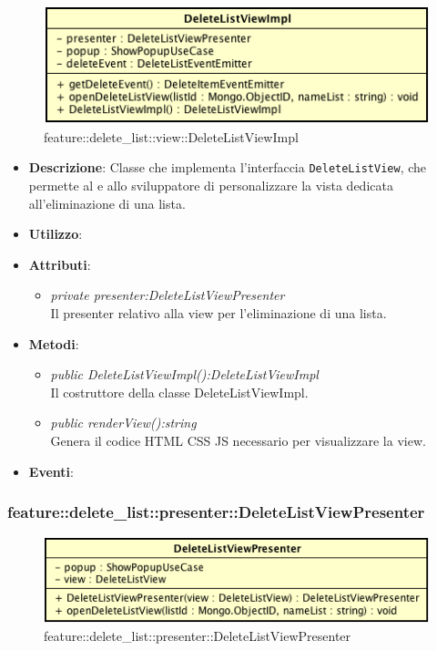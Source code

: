 \label{feature::delete_list::view::DeleteListViewImpl}
\begin{figure}[H]
	\centering
	\includegraphics[scale=0.5]{Sezioni/SottosezioniST/img/app/DeleteListViewImpl.png}
	\caption{feature::delete\_list::view::DeleteListViewImpl}
\end{figure}

\begin{itemize}
\item \textbf{Descrizione}: Classe che implementa l'interfaccia \texttt{DeleteListView}, che permette al  e allo sviluppatore di personalizzare la vista dedicata all'eliminazione di una lista.
\item \textbf{Utilizzo}:
\item \textbf{Attributi}: 
	\begin{itemize}
	\item \textit{private presenter:DeleteListViewPresenter}\\
		Il presenter relativo alla view per l'eliminazione di una lista.
	\end{itemize}
\item \textbf{Metodi}:
	\begin{itemize}
	\item \textit{public DeleteListViewImpl():DeleteListViewImpl}\\
	Il costruttore della classe DeleteListViewImpl.
	\item \textit{public renderView():string}\\
			Genera il codice HTML CSS JS necessario per visualizzare la view.
	\end{itemize}
\item \textbf{Eventi}:
\end{itemize}

\subsubsection{feature::delete\_list::presenter::DeleteListViewPresenter}

\label{feature::delete_list::presenter::DeleteListViewPresenter}
\begin{figure}[H]
	\centering
	\includegraphics[scale=0.5]{Sezioni/SottosezioniST/img/app/DeleteListViewPresenter.png}
	\caption{feature::delete\_list::presenter::DeleteListViewPresenter}
\end{figure}

